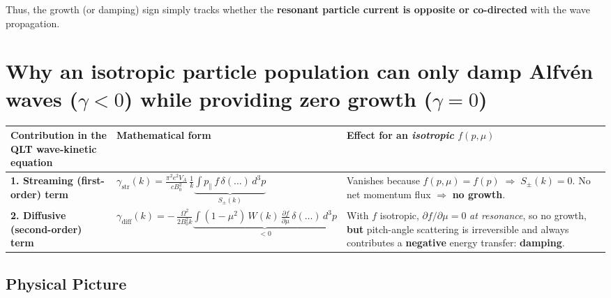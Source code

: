 \bigskip

\noindent
Thus, the growth (or damping) sign simply tracks whether the \textbf{resonant particle current is opposite or co-directed} with the wave propagation.

\section*{Why an \textbf{isotropic particle population} can \textbf{only damp} Alfvén waves ($\gamma < 0$) while providing \textbf{zero growth} ($\gamma = 0$)}

\begin{center}
\renewcommand{\arraystretch}{1.5}
\begin{tabular}{@{}p{4.4cm} p{6.4cm} p{6.2cm}@{}}
\toprule
\textbf{Contribution in the QLT wave-kinetic equation} &
\textbf{Mathematical form} &
\textbf{Effect for an \textit{isotropic} $f(p,\mu)$} \\
\midrule
\textbf{1. Streaming (first-order) term} &
$\displaystyle \gamma_{\text{str}}(k)=\frac{\pi^2 e^2 V_A}{c B_0^2}\,\frac{1}{k}
\underbrace{\int p_\parallel\,f\,\delta(\dots)\,d^3p}_{S_\pm(k)}$ &
Vanishes because $f(p,\mu)=f(p)\;\Rightarrow\;S_\pm(k)=0$.
No net momentum flux $\Rightarrow$ \textbf{no growth}. \\
\textbf{2. Diffusive (second-order) term} &
$\displaystyle \gamma_{\text{diff}}(k) = 
-\,\frac{\Omega^2}{2 B_0^2 k}
\underbrace{\int\!(1-\mu^2)\,W(k)\,\frac{\partial f}{\partial\mu}\,\delta(\dots)\,d^3p}_{<0}$ &
With $f$ isotropic, $\partial f/\partial\mu = 0$ \textit{at resonance}, so no growth,
\textbf{but} pitch-angle scattering is irreversible and always contributes a \textbf{negative} energy transfer: \textbf{damping}. \\
\bottomrule
\end{tabular}
\end{center}

\subsection*{Physical Picture}

